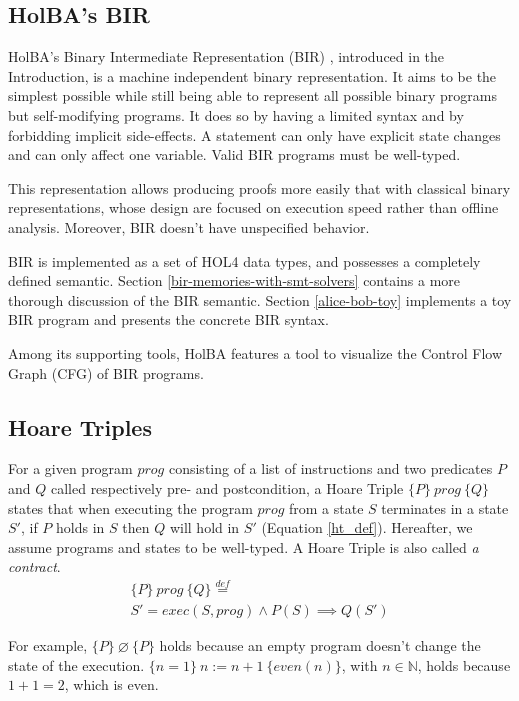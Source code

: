 \documentclass[10pt,a4paper]{article}
\newcommand{\htriple}[3]{\ensuremath{\{#1\}~#2~\{#3\}}}
\newcommand{\eqdef}{\stackrel{def}{=}}
\begin{document}
\begin{multicols}{2}
\subsection{HolBA's BIR} \label{bir-presentation}

HolBA's Binary Intermediate Representation (BIR) \cite{lindner_trabin:_2019}, introduced in the Introduction, is a machine independent binary representation. It aims to be the simplest possible while still being able to represent all possible binary programs but self-modifying programs. It does so by having a limited syntax and by forbidding implicit side-effects. A statement can only have explicit state changes and can only affect one variable. Valid BIR programs must be well-typed.

This representation allows producing proofs more easily that with classical binary representations, whose design are focused on execution speed rather than offline analysis. Moreover, BIR doesn't have unspecified behavior.

BIR is implemented as a set of HOL4 data types, and possesses a completely defined semantic. Section \ref{bir-memories-with-smt-solvers} contains a more thorough discussion of the BIR semantic. Section \ref{alice-bob-toy} implements a toy BIR program and presents the concrete BIR syntax.

Among its supporting tools, HolBA features a tool to visualize the Control Flow Graph ({CFG}) of BIR programs.

\subsection{Hoare Triples} \label{hoare-triples}

For a given program $prog$ consisting of a list of instructions and two predicates $P$ and $Q$ called respectively pre- and postcondition, a Hoare Triple \htriple{P}{prog}{Q} states that when executing the program $prog$ from a state $S$ terminates in a state $S'$, if $P$ holds in $S$ then $Q$ will hold in $S'$ (Equation \ref{ht_def}). Hereafter, we assume programs and states to be well-typed. A Hoare Triple is also called \textit{a contract}.
\begin{multline}
  \htriple{P}{prog}{Q} \eqdef\\
  S' = exec(S, prog) \land P(S) \implies Q(S')
  \label{ht_def}
\end{multline}

For example, \htriple{P}{\varnothing}{P} holds because an empty program doesn't change the state of the execution. \htriple{n=1}{n:=n+1}{even(n)}, with $n \in \mathbb{N}$, holds because $1+1=2$, which is even.


\end{multicols}
\end{document}
